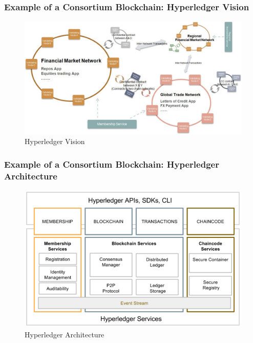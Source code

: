\documentclass[8pt]{beamer}
\begin{document}
\begin{frame}
\frametitle{Example of a Consortium Blockchain: Hyperledger Vision}

\begin{figure}[tb]
 \centering
 \includegraphics[width=11 cm,keepaspectratio=true]{./blockchain_images/hyperledger_vision.png}
 \caption{Hyperledger Vision\footnotemark}
\end{figure}
\end{frame}

\begin{frame}
\frametitle{Example of a Consortium Blockchain: Hyperledger Architecture}

\begin{figure}[tb]
 \centering
 \includegraphics[width=9 cm,keepaspectratio=true]{./blockchain_images/hyperledger_architecture.png}
 \caption{Hyperledger Architecture\footnotemark}
\end{figure}
\end{frame}
\end{document}
